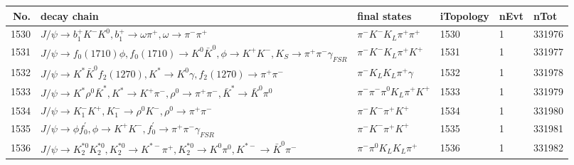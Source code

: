 \begin{table}[htbp] 
\begin{center}
\begin{small}
\begin{tabular}{rlllll}\hline\hline
 No. & decay chain & final states &  iTopology & nEvt & nTot \\\hline
1530&$J/\psi       \rightarrow b_{1}^{+}      K^{-}          K^{0}          , b_{1}^{+}       \rightarrow \omega         \pi^{+}        , \omega          \rightarrow \pi^{-}        \pi^{+}        $&$\pi^{-}        K^{-}          K_{L}          \pi^{+}        \pi^{+}        $& 1530&    1&331976\\
1531&$J/\psi       \rightarrow f_{0}(1710)    \phi           , f_{0}(1710)     \rightarrow K^{0}          \bar{K}^{0}   , \phi            \rightarrow K^{+}          K^{-}          , K_{S}           \rightarrow \pi^{+}        \pi^{-}        \gamma_{FSR} $&$\pi^{-}        K^{-}          K_{L}          \pi^{+}        K^{+}          $& 1531&    1&331977\\
1532&$J/\psi       \rightarrow K^{*}          \bar{K}^{0}   f_{2}(1270)    , K^{*}           \rightarrow K^{0}          \gamma       , f_{2}(1270)     \rightarrow \pi^{+}        \pi^{-}        $&$\pi^{-}        K_{L}          K_{L}          \pi^{+}        \gamma       $& 1532&    1&331978\\
1533&$J/\psi       \rightarrow K^{*}          \rho^{0}      \bar{K}^{*}   , K^{*}           \rightarrow K^{+}          \pi^{-}        , \rho^{0}       \rightarrow \pi^{+}        \pi^{-}        , \bar{K}^{*}    \rightarrow \bar{K}^{0}   \pi^{0}        $&$\pi^{-}        \pi^{-}        \pi^{0}        K_{L}          \pi^{+}        K^{+}          $& 1533&    1&331979\\
1534&$J/\psi       \rightarrow K_{1}^{-}      K^{+}          , K_{1}^{-}       \rightarrow \rho^{0}      K^{-}          , \rho^{0}       \rightarrow \pi^{+}        \pi^{-}        $&$\pi^{-}        K^{-}          \pi^{+}        K^{+}          $& 1534&    1&331980\\
1535&$J/\psi       \rightarrow \phi           f^{'}_{0}     , \phi            \rightarrow K^{+}          K^{-}          , f^{'}_{0}      \rightarrow \pi^{+}        \pi^{-}        \gamma_{FSR} $&$\pi^{-}        K^{-}          \pi^{+}        K^{+}          $& 1535&    1&331981\\
1536&$J/\psi       \rightarrow K_2^{*0}       K_2^{*0}       , K_2^{*0}        \rightarrow K^{*-}         \pi^{+}        , K_2^{*0}        \rightarrow K^{0}          \pi^{0}        , K^{*-}          \rightarrow \bar{K}^{0}   \pi^{-}        $&$\pi^{-}        \pi^{0}        K_{L}          K_{L}          \pi^{+}        $& 1536&    1&331982\\

\end{tabular}
\end{small}
\end{center}
\end{table}
